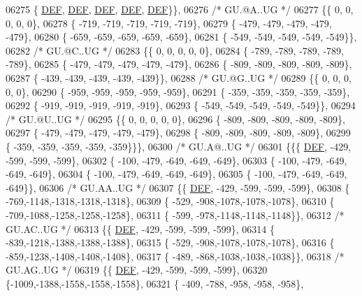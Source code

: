 \begin{DoxyCode}
06275 \{  \mbox{\hyperlink{1_88_84__epars_8h_a397419fc12b37ed479c8abb9d444d843}{DEF}},  \mbox{\hyperlink{1_88_84__epars_8h_a397419fc12b37ed479c8abb9d444d843}{DEF}},  \mbox{\hyperlink{1_88_84__epars_8h_a397419fc12b37ed479c8abb9d444d843}{DEF}},  \mbox{\hyperlink{1_88_84__epars_8h_a397419fc12b37ed479c8abb9d444d843}{DEF}},  \mbox{\hyperlink{1_88_84__epars_8h_a397419fc12b37ed479c8abb9d444d843}{DEF}}\}\},
06276 \textcolor{comment}{/* GU.@A..UG */}
06277 \{\{    0,    0,    0,    0,    0\},
06278 \{ -719, -719, -719, -719, -719\},
06279 \{ -479, -479, -479, -479, -479\},
06280 \{ -659, -659, -659, -659, -659\},
06281 \{ -549, -549, -549, -549, -549\}\},
06282 \textcolor{comment}{/* GU.@C..UG */}
06283 \{\{    0,    0,    0,    0,    0\},
06284 \{ -789, -789, -789, -789, -789\},
06285 \{ -479, -479, -479, -479, -479\},
06286 \{ -809, -809, -809, -809, -809\},
06287 \{ -439, -439, -439, -439, -439\}\},
06288 \textcolor{comment}{/* GU.@G..UG */}
06289 \{\{    0,    0,    0,    0,    0\},
06290 \{ -959, -959, -959, -959, -959\},
06291 \{ -359, -359, -359, -359, -359\},
06292 \{ -919, -919, -919, -919, -919\},
06293 \{ -549, -549, -549, -549, -549\}\},
06294 \textcolor{comment}{/* GU.@U..UG */}
06295 \{\{    0,    0,    0,    0,    0\},
06296 \{ -809, -809, -809, -809, -809\},
06297 \{ -479, -479, -479, -479, -479\},
06298 \{ -809, -809, -809, -809, -809\},
06299 \{ -359, -359, -359, -359, -359\}\}\},
06300 \textcolor{comment}{/* GU.A@..UG */}
06301 \{\{\{  \mbox{\hyperlink{1_88_84__epars_8h_a397419fc12b37ed479c8abb9d444d843}{DEF}}, -429, -599, -599, -599\},
06302 \{ -100, -479, -649, -649, -649\},
06303 \{ -100, -479, -649, -649, -649\},
06304 \{ -100, -479, -649, -649, -649\},
06305 \{ -100, -479, -649, -649, -649\}\},
06306 \textcolor{comment}{/* GU.AA..UG */}
06307 \{\{  \mbox{\hyperlink{1_88_84__epars_8h_a397419fc12b37ed479c8abb9d444d843}{DEF}}, -429, -599, -599, -599\},
06308 \{ -769,-1148,-1318,-1318,-1318\},
06309 \{ -529, -908,-1078,-1078,-1078\},
06310 \{ -709,-1088,-1258,-1258,-1258\},
06311 \{ -599, -978,-1148,-1148,-1148\}\},
06312 \textcolor{comment}{/* GU.AC..UG */}
06313 \{\{  \mbox{\hyperlink{1_88_84__epars_8h_a397419fc12b37ed479c8abb9d444d843}{DEF}}, -429, -599, -599, -599\},
06314 \{ -839,-1218,-1388,-1388,-1388\},
06315 \{ -529, -908,-1078,-1078,-1078\},
06316 \{ -859,-1238,-1408,-1408,-1408\},
06317 \{ -489, -868,-1038,-1038,-1038\}\},
06318 \textcolor{comment}{/* GU.AG..UG */}
06319 \{\{  \mbox{\hyperlink{1_88_84__epars_8h_a397419fc12b37ed479c8abb9d444d843}{DEF}}, -429, -599, -599, -599\},
06320 \{-1009,-1388,-1558,-1558,-1558\},
06321 \{ -409, -788, -958, -958, -958\},

\end{DoxyCode}
